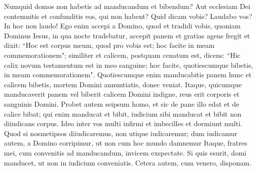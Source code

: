 \begin{biblechapter}
\verse Numquid domos non habetis ad manducandum et bibendum? Aut ecclesiam Dei contemnitis et confunditis eos, qui non habent? Quid dicam vobis? Laudabo vos? In hoc non laudo! 
\verse Ego enim accepi a Domino, quod et tradidi vobis, quoniam Dominus Iesus, in qua nocte tradebatur, accepit panem 
\verse et gratias agens fregit et dixit: “Hoc est corpus meum, quod pro vobis est; hoc facite in meam commemorationem";  
\verse similiter et calicem, postquam cenatum est, dicens: “Hic calix novum testamentum est in meo sanguine; hoc facite, quotiescumque bibetis, in meam commemorationem". 
\verse Quotiescumque enim manducabitis panem hunc et calicem bibetis, mortem Domini annuntiatis, donec veniat. 
\verse Itaque, quicumque manducaverit panem vel biberit calicem Domini indigne, reus erit corporis et sanguinis Domini. 
\verse Probet autem seipsum homo, et sic de pane illo edat et de calice bibat; 
\verse qui enim manducat et bibit, iudicium sibi manducat et bibit non diiudicans corpus. 
\verse Ideo inter vos multi infirmi et imbecilles et dormiunt multi. 
\verse Quod si nosmetipsos diiudicaremus, non utique iudicaremur; 
\verse dum iudicamur autem, a Domino corripimur, ut non cum hoc mundo damnemur 
\verse Itaque, fratres mei, cum convenitis ad manducandum, invicem exspectate. 
\verse Si quis esurit, domi manducet, ut non in iudicium conveniatis. Cetera autem, cum venero, disponam. 
\end{biblechapter}


